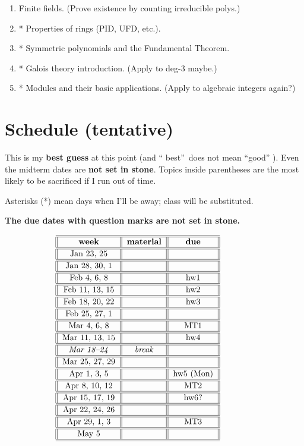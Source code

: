 \documentclass[numbers=enddot,12pt,final,onecolumn,notitlepage]{scrartcl}%
\theoremstyle{definition}
\newenvironment{noncompile}{}{}
\begin{document}
\begin{enumerate}
\item Finite fields. (Prove existence by counting irreducible polys.)

\item * Properties of rings (PID, UFD, etc.).

\item * Symmetric polynomials and the Fundamental Theorem.

\item * Galois theory introduction. (Apply to deg-$3$ maybe.)

\item * Modules and their basic applications. (Apply to algebraic integers again?)
\end{enumerate}

\section{Schedule (tentative)}

\begin{noncompile}
This is my \textbf{best guess} at this point (and \textquotedblleft
best\textquotedblright\ does not mean \textquotedblleft good\textquotedblright%
). Even the midterm dates are \textbf{not set in stone}. Topics inside
parentheses are the most likely to be sacrificed if I run out of time.

Asterisks (*) mean days when I'll be away; class will be substituted.
\end{noncompile}

\textbf{The due dates with question marks are not set in stone.}%

\[%
\begin{tabular}
[c]{||c||c||c||}\hline\hline
\textbf{week} & \textbf{material} & \textbf{due}\\\hline\hline
Jan 23, 25 &  & \\\hline\hline
Jan 28, 30, 1 &  & \\\hline\hline
Feb 4, 6, 8 &  & hw1\\\hline\hline
Feb 11, 13, 15 &  & hw2\\\hline\hline
Feb 18, 20, 22 &  & hw3\\\hline\hline
Feb 25, 27, 1 &  & \\\hline\hline
Mar 4, 6, 8 &  & MT1\\\hline\hline
Mar 11, 13, 15 &  & hw4\\\hline\hline
\textit{Mar 18--24} & \textit{break} & \\\hline\hline
Mar 25, 27, 29 &  & \\\hline\hline
Apr 1, 3, 5 &  & hw5 (Mon)\\\hline\hline
Apr 8, 10, 12 &  & MT2\\\hline\hline
Apr 15, 17, 19 &  & hw6?\\\hline\hline
Apr 22, 24, 26 &  & \\\hline\hline
Apr 29, 1, 3 &  & MT3\\\hline\hline
May 5 &  & \\\hline\hline
\end{tabular}
\ \ \ \ \ \ \ \ \ \ \ \
\]
\end{document}

